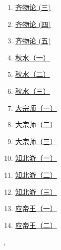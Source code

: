 \documentclass[11pt]{article}
\renewcommand{\today}{\shortmonthname[\the\month] \the \day,  \the\year}
\begin{document}
\begin{multicols}{3}
\begin{enumerate}
		\item \href{https://mp.weixin.qq.com/s/cSW-oFFyWh5yrRQZY0omxA}{齐物论 (三)}	%
		\item \href{https://mp.weixin.qq.com/s/m1wdAWroknqNxbJvIQA1eA}{齐物论 (四)}	%
		\item \href{https://mp.weixin.qq.com/s/nUMIo1q1eyFUwKJ981aVRg}{齐物论 (五)}	%
		\item \href{https://mp.weixin.qq.com/s/D509XEtT0mzhrG6eVb23eA}{秋水（一）}	%
		\item \href{https://mp.weixin.qq.com/s/ELi9Iv1iVf6vNxKDgcu3Ew}{秋水（二）}	%
		\item \href{https://mp.weixin.qq.com/s/xG_1jSY50_jBskl77m7YRQ}{秋水（三）}	%
		\item \href{https://mp.weixin.qq.com/s/PiUqwZku-fOyB_z9OXIiHg}{大宗师（一）}	%
		\item \href{https://mp.weixin.qq.com/s/tT4V2S4PKcghQAhlMdJpjg}{大宗师（二）}	%
		\item \href{https://mp.weixin.qq.com/s/o5r2iD2HlxNT8iKYX6ISOQ}{大宗师（三）}	%
		\item \href{https://mp.weixin.qq.com/s/eqS7U5ZCGo8f9zYgkMGxLQ}{知北游（一）}	%
		\item \href{https://mp.weixin.qq.com/s/f2odgznyESHJo6-fkOdLnQ}{知北游（二）}	%
		\item \href{https://mp.weixin.qq.com/s/OCjpLq3TRgqtUd5TH6UB2w}{知北游（三）}	%
		\item \href{https://mp.weixin.qq.com/s/LZ3VOCtFHDXiBuX_3_g3lQ}{应帝王（一）}	%
		\item \href{https://mp.weixin.qq.com/s/73Rjra-Am5RzuqAzYur5zw}{应帝王（二）}	%
	\end{enumerate}
\end{multicols}






%
\begin{flushright}
	\tiny \today 
\end{flushright}
\end{document}
